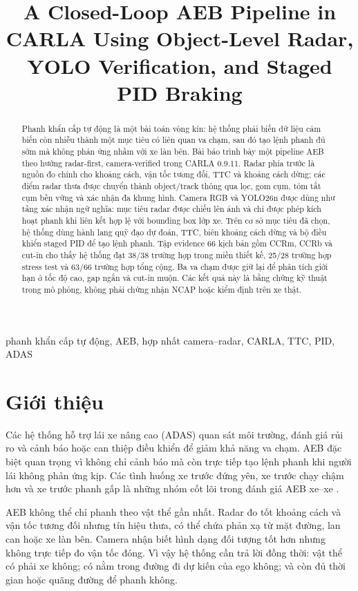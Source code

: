 \documentclass[conference]{IEEEtran}
\title{A Closed-Loop AEB Pipeline in CARLA Using Object-Level Radar, YOLO Verification, and Staged PID Braking}
\author{
\IEEEauthorblockN{Mai Việt Hoàng và Phạm Đức An}
\IEEEauthorblockA{
\textit{Đại học Bách khoa Hà Nội}\\
Hà Nội, Việt Nam\\
hoangmai04222@gmail.com
}
}
\begin{document}
\maketitle
\begin{abstract}
Phanh khẩn cấp tự động là một bài toán vòng kín: hệ thống phải biến dữ liệu cảm biến còn nhiễu thành một mục tiêu có liên quan va chạm, sau đó tạo lệnh phanh đủ sớm mà không phản ứng nhầm với xe làn bên. Bài báo trình bày một pipeline AEB theo hướng radar-first, camera-verified trong CARLA 0.9.11. Radar phía trước là nguồn đo chính cho khoảng cách, vận tốc tương đối, TTC và khoảng cách dừng; các điểm radar thưa được chuyển thành object/track thông qua lọc, gom cụm, tóm tắt cụm bền vững và xác nhận đa khung hình. Camera RGB và YOLO26n được dùng như tầng xác nhận ngữ nghĩa: mục tiêu radar được chiếu lên ảnh và chỉ được phép kích hoạt phanh khi liên kết hợp lệ với bounding box lớp xe. Trên cơ sở mục tiêu đã chọn, hệ thống dùng hành lang quỹ đạo dự đoán, TTC, biên khoảng cách dừng và bộ điều khiển staged PID để tạo lệnh phanh. Tập evidence 66 kịch bản gồm CCRm, CCRb và cut-in cho thấy hệ thống đạt 38/38 trường hợp trong miền thiết kế, 25/28 trường hợp stress test và 63/66 trường hợp tổng cộng. Ba va chạm được giữ lại để phân tích giới hạn ở tốc độ cao, gap ngắn và cut-in muộn. Các kết quả này là bằng chứng kỹ thuật trong mô phỏng, không phải chứng nhận NCAP hoặc kiểm định trên xe thật.
\end{abstract}
\begin{IEEEkeywords}
phanh khẩn cấp tự động, AEB, hợp nhất camera--radar, CARLA, TTC, PID, ADAS
\end{IEEEkeywords}

\section{Giới thiệu}
Các hệ thống hỗ trợ lái xe nâng cao (ADAS) quan sát môi trường, đánh giá rủi ro và cảnh báo hoặc can thiệp điều khiển để giảm khả năng va chạm. AEB đặc biệt quan trọng vì không chỉ cảnh báo mà còn trực tiếp tạo lệnh phanh khi người lái không phản ứng kịp. Các tình huống xe trước đứng yên, xe trước chạy chậm hơn và xe trước phanh gấp là những nhóm cốt lõi trong đánh giá AEB xe--xe \cite{euroncap_aeb,iso15623}.

AEB không thể chỉ phanh theo vật thể gần nhất. Radar đo tốt khoảng cách và vận tốc tương đối nhưng tín hiệu thưa, có thể chứa phản xạ từ mặt đường, lan can hoặc xe làn bên. Camera nhận biết hình dạng đối tượng tốt hơn nhưng không trực tiếp đo vận tốc đóng. Vì vậy hệ thống cần trả lời đồng thời: vật thể có phải xe không; có nằm trong đường đi dự kiến của ego không; và còn đủ thời gian hoặc quãng đường để phanh không.
\end{document}
